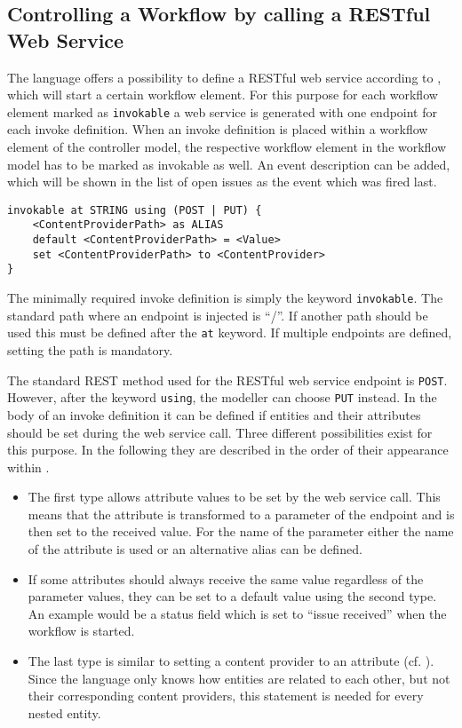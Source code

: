 \subsection{Controlling a Workflow by calling a RESTful Web Service}
\label{subsec: WorkflowControlThroughWS}
The \MD language offers a possibility to define a RESTful web service according to , which will start a certain workflow element. For this purpose for each workflow element marked as \lstinline|invokable| a web service is generated with one endpoint for each invoke definition. 
When an invoke definition is placed within a workflow element of the controller model, the respective workflow element in the workflow model has to be marked as invokable as well. An event description can be added, which will be shown in the list of open issues as the event which was fired last.

\begin{lstlisting}[language=MD2, label=lst:offerWStoSWF, caption=Offer a web service to start a workflow]
invokable at STRING using (POST | PUT) {
	<ContentProviderPath> as ALIAS
	default <ContentProviderPath> = <Value>
	set <ContentProviderPath> to <ContentProvider>
}
\end{lstlisting}
The minimally required invoke definition is simply the keyword \lstinline|invokable|. The standard path where an endpoint is injected is \enquote{/}. If another path should be used this must be defined after the \lstinline|at| keyword. If multiple endpoints are defined, setting the path is mandatory.

The standard REST method used for the RESTful web service endpoint is \lstinline|POST|. However, after the keyword \lstinline|using|, the modeller can choose \lstinline|PUT| instead.
In the body of an invoke definition it can be defined if entities and their attributes should be set during the web service call. Three different possibilities exist for this purpose. In the following they are described in the order of their appearance within .

\begin{itemize}
	\item The first type allows attribute values to be set by the web service call. This means that the attribute is transformed to a parameter of the endpoint and is then set to the received value. For the name of the parameter either the name of the attribute is used or an alternative alias can be defined.
	\item If some attributes should always receive the same value regardless of the parameter values, they can be set to a default value using the second type. An example would be a status field which is set to \enquote{issue received} when the workflow is started.
	\item The last type is similar to setting a content provider to an attribute (cf. ). Since the language only knows how entities are related to each other, but not their corresponding content providers, this statement is needed for every nested entity.
\end{itemize}


